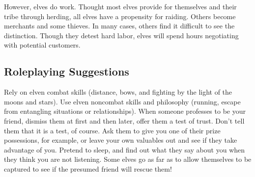 However, elves do work. Thought most elves provide for themselves and their tribe through herding, all elves have a propensity for raiding. Others become merchants and some thieves. In many cases, others find it difficult to see the distinction. Though they detest hard labor, elves will spend hours negotiating with potential customers.

\subsection{Roleplaying Suggestions}
Rely on elven combat skills (distance, bows, and fighting by the light of the moons and stars). Use elven noncombat skills and philosophy (running, escape from entangling situations or relationships). When someone professes to be your friend, dismiss them at first and then later, offer them a test of trust. Don't tell them that it is a test, of course. Ask them to give you one of their prize possessions, for example, or leave your own valuables out and see if they take advantage of you. Pretend to sleep, and find out what they say about you when they think you are not listening. Some elves go as far as to allow themselves to be captured to see if the presumed friend will rescue them!

